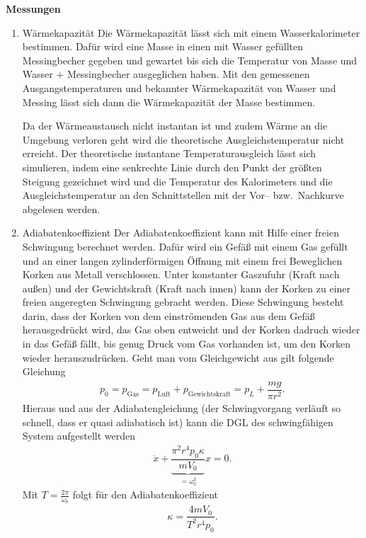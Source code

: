 \textbf{Messungen} 
\begin{enumerate}[label=--]
        \item Wärmekapazität \hspace{25pt} 
                Die Wärmekapazität lässt sich mit einem Wasserkalorimeter bestimmen. 
                Dafür wird eine Masse in einen mit Wasser gefüllten Messingbecher gegeben und gewartet bis sich die Temperatur von Masse und Wasser + Messingbecher ausgeglichen haben. 
                Mit den gemessenen Ausgangstemperaturen und bekannter Wärmekapazität von Wasser und Messing lässt sich dann die Wärmekapazität der Masse bestimmen.\par
                Da der Wärmeaustausch nicht instantan ist und zudem Wärme an die Umgebung verloren geht wird die theoretische Ausgleichstemperatur nicht erreicht.
                Der theoretische instantane Temperaturausgleich lässt sich simulieren, indem eine senkrechte Linie durch den Punkt der größten Steigung gezeichnet wird und die Temperatur des Kalorimeters und die Ausgleichstemperatur an den Schnittstellen mit der Vor-- bzw.\ Nachkurve abgelesen werden.
        \item Adiabatenkoeffizient \hspace{25pt} 
                Der Adiabatenkoeffizient kann mit Hilfe einer freien Schwingung berechnet werden.
                Dafür wird ein Gefäß mit einem Gas gefüllt und an einer langen zylinderförmigen Öffnung mit einem frei Beweglichen Korken aus Metall \glqq verschlossen\grqq{}.
                Unter konstanter Gaszufuhr (Kraft nach außen) und der Gewichtskraft (Kraft nach innen) kann der Korken zu einer freien angeregten Schwingung gebracht werden.
                Diese Schwingung besteht darin, dass der Korken von dem einströmenden Gas aus dem Gefäß herausgedrückt wird, das Gas oben entweicht und der Korken dadruch wieder in das Gefäß fällt, bis genug Druck vom Gas vorhanden ist, um den Korken wieder herauszudrücken.
                Geht man vom Gleichgewicht aus gilt folgende Gleichung
                \begin{align} 
                        p_0=p _{\text{Gas}}=p _{\text{Luft}}+p _{\text{Gewichtskraft}}=p_L+\dfrac{mg}{\pi r^2}
                .\end{align} 
                Hieraus und aus der Adiabatengleichung (der Schwingvorgang verläuft so schnell, dass er quasi adiabatisch ist) kann die DGL des schwingfähigen System aufgestellt werden
                \begin{align} 
                        \ddot{x}+\underbrace{\dfrac{\pi ^2r^4p_0\kappa }{mV_0}}_{=\omega _0^2}x=0
                .\end{align} 
                Mit $T=\tfrac{2\pi }{\omega _0}$ folgt für den Adiabatenkoeffizient
                \begin{align} 
                        \kappa =\dfrac{4mV_0}{T^2r^4p_0}
                .\end{align} 
\end{enumerate}

